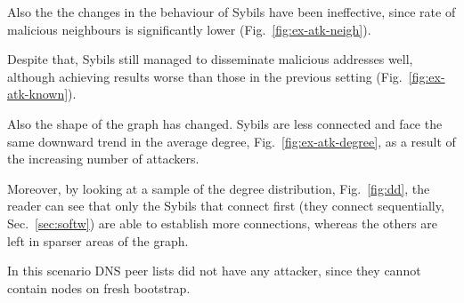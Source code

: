 Also the the changes in the behaviour of Sybils have been ineffective, since rate of malicious neighbours is significantly lower (Fig.~\ref{fig:ex-atk-neigh}).\par

Despite that, Sybils still managed to disseminate malicious addresses well, although achieving results worse than those in the previous setting (Fig.~\ref{fig:ex-atk-known}).\par

Also the shape of the graph has changed. Sybils are less connected and face the same downward trend in the average degree, Fig.~\ref{fig:ex-atk-degree}, as a result of the increasing number of attackers.

Moreover, by looking at a sample of the degree distribution, Fig.~\ref{fig:dd}, the reader can see that only the Sybils that connect first (they connect sequentially, Sec.~\ref{sec:softw}) are able to establish more connections, whereas the others are left in sparser areas of the graph.\par

In this scenario DNS peer lists did not have any attacker, since they cannot contain nodes on fresh bootstrap.